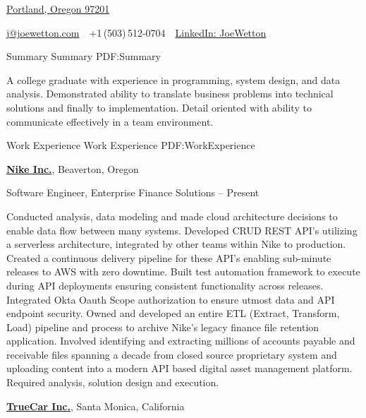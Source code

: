 \documentclass[letterpaper,MMMyyyy,nonstopmode]{simpleresumecv}
\newcommand{\CVAuthor}{Joseph Wetton}
\newcommand{\CVWebpage}{https://www.linkedin.com/in/joewetton/}
\begin{document}
	\thispagestyle{empty}
	
	
	\Title{\CVAuthor}
	
	\begin{SubTitle}
		\href{https://duckduckgo.com/?q=portland+Oregon+97201&ia=web&iaxm=maps}
		{Portland, Oregon 97201}
		\par
		\href{mailto:j@joewetton.com}
		{j@joewetton.com}
		\,\SubBulletSymbol\,
		+1\,(503)\,512‬-0704
		\,\SubBulletSymbol\,
		\href{\CVWebpage}
		{LinkedIn: JoeWetton}
	\end{SubTitle}
	
	\begin{Body}
		
		
		\Section
		{Summary}
		{Summary}
		{PDF:Summary}
		
		\Entry
		A college graduate with experience in programming, system design, and data analysis. Demonstrated ability to translate business problems into technical solutions and finally to implementation. Detail oriented with ability to communicate effectively in a team environment.
		
		
		
		
		\Section
		{Work\newline
			Experience}
		{Work Experience}
		{PDF:WorkExperience}
		
		\Entry
		\href{https://www.nike.com}
		{\textbf{Nike Inc.}},
		Beaverton, Oregon
		
		\BulletItem
		Software Engineer, Enterprise Finance Solutions
		\hfill
		 --
		Present
		\begin{Detail}
			\SubBulletItem
			Conducted analysis, data modeling and made cloud architecture decisions to enable data flow between many systems.
			\SubBulletItem
			Developed CRUD REST API’s utilizing a serverless architecture, integrated by other teams within Nike to production.
			\SubBulletItem
			Created a continuous delivery pipeline for these API’s enabling sub-minute releases to AWS with zero downtime.
			\SubBulletItem
			Built test automation framework to execute during API deployments ensuring consistent functionality across releases.
			\SubBulletItem
			Integrated Okta Oauth Scope authorization to ensure utmost data and API endpoint security.
			\SubBulletItem
			Owned and developed an entire ETL (Extract, Transform, Load) pipeline and process to archive Nike's legacy finance file retention application. Involved identifying and extracting millions of accounts payable and receivable files spanning a decade from closed source proprietary system and uploading content into a modern API based digital asset management platform. Required analysis, solution design and execution.	\end{Detail}
		\Gap
		\Entry
		\href{https://www.truecar.com}
		{\textbf{TrueCar Inc.}},
		Santa Monica, California
		

\end{Body}
\end{document}
